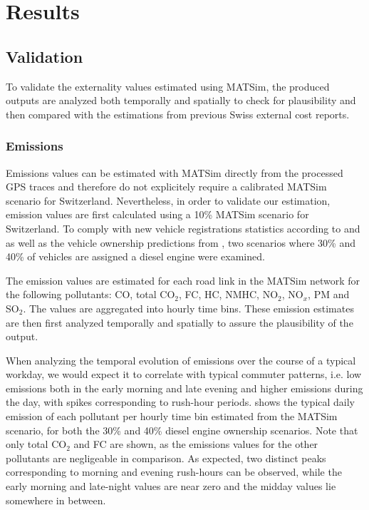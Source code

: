\section{Results}
\subsection{Validation}
To validate the externality values estimated using MATSim, the produced outputs are analyzed both temporally and spatially to check for plausibility and then compared with the estimations from previous Swiss external cost reports.

\subsubsection{Emissions}
Emissions values can be estimated with MATSim directly from the processed GPS traces and therefore do not explicitely require a calibrated MATSim scenario for Switzerland.
Nevertheless, in order to validate our estimation, emission values are first calculated using a 10\% MATSim scenario for Switzerland.
To comply with new vehicle registrations statistics according to \citet{autoschweiz2010} and \citet{autoschweiz2012} as well as the vehicle ownership predictions from \citet{foen2010pollutants}, two scenarios where 30\% and 40\% of vehicles are assigned a diesel engine were examined.

The emission values are estimated for each road link in the MATSim network for the following pollutants: CO, total CO$_2$, FC, HC, NMHC, NO$_2$, NO$_x$, PM and SO$_2$.
The values are aggregated into hourly time bins.
These emission estimates are then first analyzed temporally and spatially to assure the plausibility of the output.

When analyzing the temporal evolution of emissions over the course of a typical workday, we would expect it to correlate with typical commuter patterns, i.e. low emissions both in the early morning and late evening and higher emissions during the day, with spikes corresponding to rush-hour periods.
 shows the typical daily emission of each pollutant per hourly time bin estimated from the MATSim scenario, for both the 30\% and 40\% diesel engine ownership scenarios.
Note that only total CO$_2$ and FC are shown, as the emissions values for the other pollutants are negligeable in comparison.
As expected, two distinct peaks corresponding to morning and evening rush-hours can be observed, while the early morning and late-night values are near zero and the midday values lie somewhere in between.

